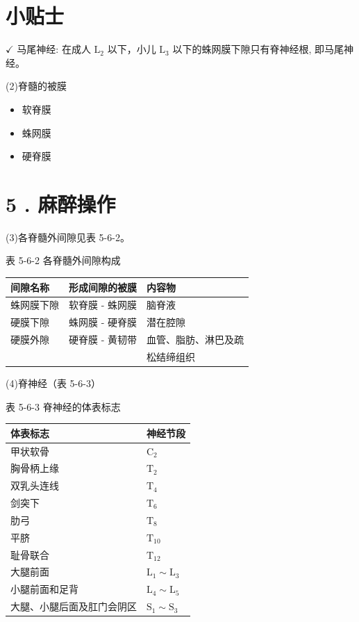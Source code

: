 \documentclass[10pt]{article}
\begin{document}
\section*{小贴士}
$\checkmark$ 马尾神经: 在成人 $\mathrm{L}_{2}$ 以下，小儿 $\mathrm{L}_{3}$ 以下的蛛网膜下隙只有脊神经根, 即马尾神经。

(2)脊髓的被膜

\begin{itemize}
  \item 软脊膜
  \item 蛛网膜
  \item 硬脊膜
\end{itemize}

\section*{5 . 麻醉操作}
(3)各脊髓外间隙见表 5-6-2。

表 5-6-2 各脊髓外间隙构成

\begin{center}
\begin{tabular}{lll}
\hline
间隙名称 & 形成间隙的被膜 & 内容物 \\
\hline
蛛网膜下隙 & 软脊膜 - 蛛网膜 & 脑脊液 \\
硬膜下隙 & 蛛网膜 - 硬脊膜 & 潜在腔隙 \\
硬膜外隙 & 硬脊膜 - 黄韧带 & 血管、脂肪、淋巴及疏 \\
 &  & 松结缔组织 \\
\hline
\end{tabular}
\end{center}

(4)脊神经（表 5-6-3）

表 5-6-3 脊神经的体表标志

\begin{center}
\begin{tabular}{ll}
\hline
体表标志 & 神经节段 \\
\hline
甲状软骨 & $\mathrm{C}_{2}$ \\
胸骨柄上缘 & $\mathrm{T}_{2}$ \\
双乳头连线 & $\mathrm{T}_{4}$ \\
剑突下 & $\mathrm{T}_{6}$ \\
肋弓 & $\mathrm{T}_{8}$ \\
平脐 & $\mathrm{T}_{10}$ \\
耻骨联合 & $\mathrm{T}_{12}$ \\
大腿前面 & $\mathrm{L}_{1} \sim \mathrm{L}_{3}$ \\
小腿前面和足背 & $\mathrm{L}_{4} \sim \mathrm{L}_{5}$ \\
大腿、小腿后面及肛门会阴区 & $\mathrm{S}_{1} \sim \mathrm{S}_{3}$ \\
\hline
\end{tabular}
\end{center}
\end{document}
